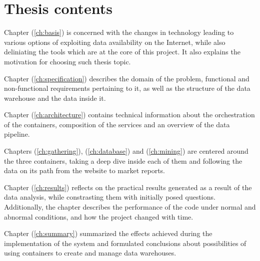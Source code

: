 \section{Thesis contents}
Chapter (\ref{ch:basis}) is concerned with the changes in technology leading to various options of exploiting data availability on the Internet, while also deliniating the tools which are at the core of this project. It also explains the motivation for choosing such thesis topic. \par
Chapter (\ref{ch:specification}) describes the domain of the problem, functional and non-functional requirements pertaining to it, as well as the structure of the data warehouse and the data inside it. \par
Chapter (\ref{ch:architecture}) contains technical information about the orchestration of the containers, composition of the services and an overview of the data pipeline. \par
Chapters (\ref{ch:gathering}), (\ref{ch:database}) and (\ref{ch:mining}) are centered around the three containers, taking a deep dive inside each of them and following the data on its path from the website to market reports. \par
Chapter (\ref{ch:results}) reflects on the practical results generated as a result of the data analysis, while constrasting them with initially posed questions. Additionally, the chapter describes the performance of the code under normal and abnormal conditions, and how the project changed with time. \par
Chapter (\ref{ch:summary}) summarized the effects achieved during the implementation of the system and formulated conclusions about possibilities of using containers to create and manage data warehouses.